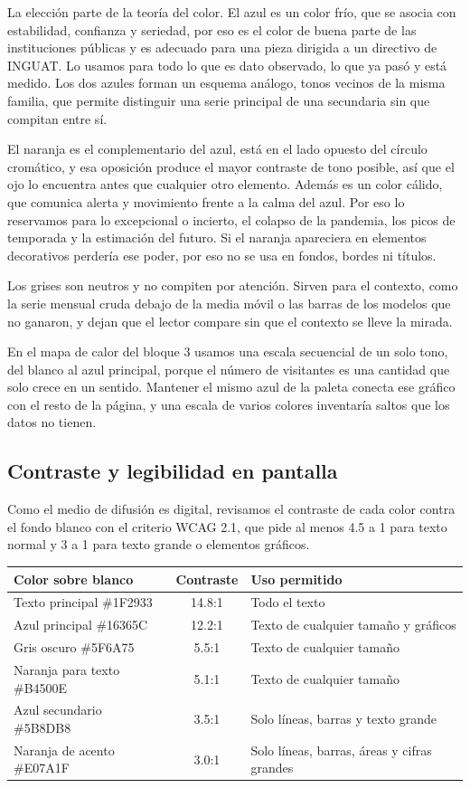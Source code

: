 La elección parte de la teoría del color. El azul es un color frío, que se asocia con
estabilidad, confianza y seriedad, por eso es el color de buena parte de las instituciones
públicas y es adecuado para una pieza dirigida a un directivo de INGUAT. Lo usamos para todo lo
que es dato observado, lo que ya pasó y está medido. Los dos azules forman un esquema análogo,
tonos vecinos de la misma familia, que permite distinguir una serie principal de una secundaria
sin que compitan entre sí.

El naranja es el complementario del azul, está en el lado opuesto del círculo cromático, y esa
oposición produce el mayor contraste de tono posible, así que el ojo lo encuentra antes que
cualquier otro elemento. Además es un color cálido, que comunica alerta y movimiento frente a la
calma del azul. Por eso lo reservamos para lo excepcional o incierto, el colapso de la pandemia,
los picos de temporada y la estimación del futuro. Si el naranja apareciera en elementos
decorativos perdería ese poder, por eso no se usa en fondos, bordes ni títulos.

Los grises son neutros y no compiten por atención. Sirven para el contexto, como la serie
mensual cruda debajo de la media móvil o las barras de los modelos que no ganaron, y dejan que
el lector compare sin que el contexto se lleve la mirada.

En el mapa de calor del bloque 3 usamos una escala secuencial de un solo tono, del blanco al
azul principal, porque el número de visitantes es una cantidad que solo crece en un sentido.
Mantener el mismo azul de la paleta conecta ese gráfico con el resto de la página, y una escala
de varios colores inventaría saltos que los datos no tienen.

\subsection{Contraste y legibilidad en pantalla}

Como el medio de difusión es digital, revisamos el contraste de cada color contra el fondo
blanco con el criterio WCAG 2.1, que pide al menos 4.5 a 1 para texto normal y 3 a 1 para texto
grande o elementos gráficos.

\begin{center}
\begin{tabular}{@{}lcl@{}}
\toprule
Color sobre blanco & Contraste & Uso permitido \\
\midrule
Texto principal \#1F2933 & 14.8:1 & Todo el texto \\
Azul principal \#16365C & 12.2:1 & Texto de cualquier tamaño y gráficos \\
Gris oscuro \#5F6A75 & 5.5:1 & Texto de cualquier tamaño \\
Naranja para texto \#B4500E & 5.1:1 & Texto de cualquier tamaño \\
Azul secundario \#5B8DB8 & 3.5:1 & Solo líneas, barras y texto grande \\
Naranja de acento \#E07A1F & 3.0:1 & Solo líneas, barras, áreas y cifras grandes \\
\bottomrule
\end{tabular}
\end{center}

